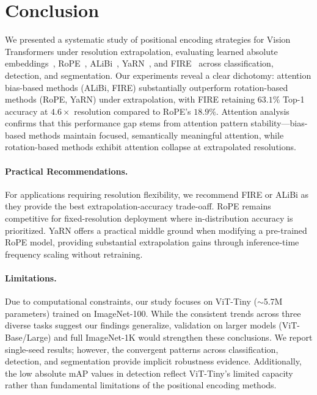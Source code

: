 \section{Conclusion}
\label{sec:conclusion}

We presented a systematic study of positional encoding strategies for Vision Transformers under
resolution extrapolation, evaluating learned absolute embeddings~\cite{dosovitskiy2021image}, RoPE~\cite{su2024roformer,heo2024rope}, ALiBi~\cite{press2022train}, YaRN~\cite{peng2024yarn}, and FIRE~\cite{li2024functional}
across classification, detection, and segmentation. Our experiments reveal a clear dichotomy:
attention bias-based methods (ALiBi, FIRE) substantially outperform rotation-based methods
(RoPE, YaRN) under extrapolation, with FIRE retaining $63.1\%$ Top-1 accuracy at $4.6\times$
resolution compared to RoPE's $18.9\%$. Attention analysis confirms that this performance gap
stems from attention pattern stability---bias-based methods maintain focused, semantically
meaningful attention, while rotation-based methods exhibit attention collapse at extrapolated
resolutions.

\paragraph{Practical Recommendations.}
For applications requiring resolution flexibility, we recommend FIRE or ALiBi as they provide
the best extrapolation-accuracy trade-oaff. RoPE remains competitive for fixed-resolution
deployment where in-distribution accuracy is prioritized. YaRN offers a practical middle ground
when modifying a pre-trained RoPE model, providing substantial extrapolation gains through
inference-time frequency scaling without retraining.

\paragraph{Limitations.}
Due to computational constraints, our study focuses on ViT-Tiny ($\sim$5.7M parameters) trained
on ImageNet-100. While the consistent trends across three diverse tasks suggest our findings
generalize, validation on larger models (ViT-Base/Large) and full ImageNet-1K would strengthen
these conclusions. We report single-seed results; however, the convergent patterns across
classification, detection, and segmentation provide implicit robustness evidence. Additionally,
the low absolute mAP values in detection reflect ViT-Tiny's limited capacity rather than
fundamental limitations of the positional encoding methods.

